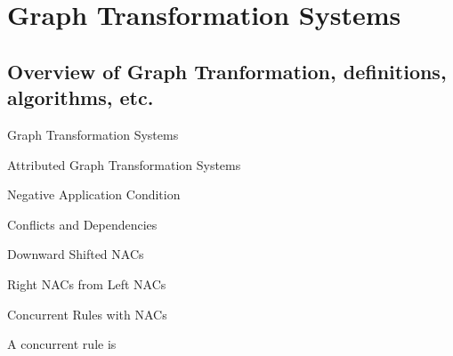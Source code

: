\chapter{Graph Transformation Systems}

\section{Overview of Graph Tranformation, definitions, algorithms, etc.}

\begin{mydef}{Graph Transformation Systems}
\end{mydef}

\begin{mydef}{Attributed Graph Transformation Systems}
\end{mydef}

\begin{mydef}{Negative Application Condition}
\end{mydef}

\begin{mydef}{Conflicts and Dependencies}
\end{mydef}

\begin{mydef}{Downward Shifted NACs}

\centerline{}


\end{mydef}

\begin{mydef}{Right NACs from Left NACs}
\end{mydef}

\begin{mydef}{Concurrent Rules with NACs}

A concurrent rule is
\end{mydef}

\centerline{
}

